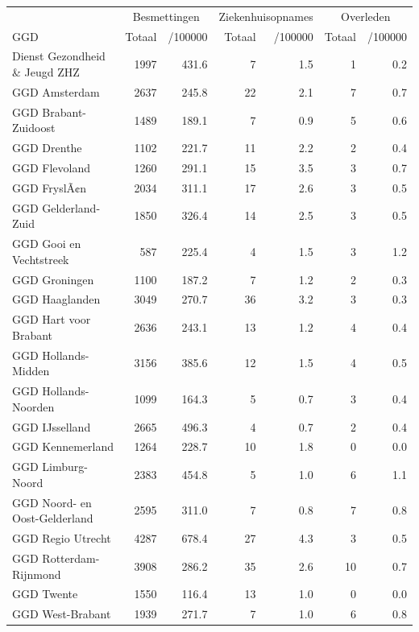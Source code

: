 \documentclass[
  english,
  man,floatsintext]{apa6}
\begin{document}
\begin{table}
\centering\begingroup\fontsize{10}{12}\selectfont

\begin{threeparttable}
\begin{tabular}{lrrrrrr}
\toprule
\multicolumn{1}{c}{ } & \multicolumn{2}{c}{Besmettingen} & \multicolumn{2}{c}{Ziekenhuisopnames} & \multicolumn{2}{c}{Overleden} \\
\cmidrule(l{3pt}r{3pt}){2-3} \cmidrule(l{3pt}r{3pt}){4-5} \cmidrule(l{3pt}r{3pt}){6-7}
GGD & Totaal & /100000 & Totaal & /100000 & Totaal & /100000\\
\midrule
Dienst Gezondheid \& Jeugd ZHZ & 1997 & 431.6 & 7 & 1.5 & 1 & 0.2\\
GGD Amsterdam & 2637 & 245.8 & 22 & 2.1 & 7 & 0.7\\
GGD Brabant-Zuidoost & 1489 & 189.1 & 7 & 0.9 & 5 & 0.6\\
GGD Drenthe & 1102 & 221.7 & 11 & 2.2 & 2 & 0.4\\
GGD Flevoland & 1260 & 291.1 & 15 & 3.5 & 3 & 0.7\\
GGD FryslÃ¢n & 2034 & 311.1 & 17 & 2.6 & 3 & 0.5\\
GGD Gelderland-Zuid & 1850 & 326.4 & 14 & 2.5 & 3 & 0.5\\
GGD Gooi en Vechtstreek & 587 & 225.4 & 4 & 1.5 & 3 & 1.2\\
GGD Groningen & 1100 & 187.2 & 7 & 1.2 & 2 & 0.3\\
GGD Haaglanden & 3049 & 270.7 & 36 & 3.2 & 3 & 0.3\\
GGD Hart voor Brabant & 2636 & 243.1 & 13 & 1.2 & 4 & 0.4\\
GGD Hollands-Midden & 3156 & 385.6 & 12 & 1.5 & 4 & 0.5\\
GGD Hollands-Noorden & 1099 & 164.3 & 5 & 0.7 & 3 & 0.4\\
GGD IJsselland & 2665 & 496.3 & 4 & 0.7 & 2 & 0.4\\
GGD Kennemerland & 1264 & 228.7 & 10 & 1.8 & 0 & 0.0\\
GGD Limburg-Noord & 2383 & 454.8 & 5 & 1.0 & 6 & 1.1\\
GGD Noord- en Oost-Gelderland & 2595 & 311.0 & 7 & 0.8 & 7 & 0.8\\
GGD Regio Utrecht & 4287 & 678.4 & 27 & 4.3 & 3 & 0.5\\
GGD Rotterdam-Rijnmond & 3908 & 286.2 & 35 & 2.6 & 10 & 0.7\\
GGD Twente & 1550 & 116.4 & 13 & 1.0 & 0 & 0.0\\
GGD West-Brabant & 1939 & 271.7 & 7 & 1.0 & 6 & 0.8\\

\end{tabular}
\end{threeparttable}
\end{table}
\end{document}

